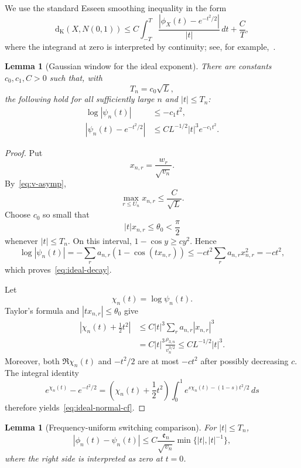 \documentclass[11pt]{article}
\newtheorem{lemma}[theorem]{Lemma}
\theoremstyle{remark}
\newcommand{\dd}{\,d}
\newcommand{\Kol}{\mathrm d_{\mathrm K}}
\begin{document}
We use the standard Esseen smoothing inequality in the form
\begin{equation}
\label{eq:esseen}
 \Kol(X,N(0,1))
 \le C\int_{-T}^T
 \frac{|\phi_X(t)-e^{-t^2/2}|}{|t|}\dd t
 +\frac{C}{T},
\end{equation}
where the integrand at zero is interpreted by continuity; see, for
example,~\cite[Chapter~V]{Petrov1975}.

\begin{lemma}[Gaussian window for the ideal exponent]
\label{lem:gaussian-window}
There are constants $c_0,c_1,C>0$ such that, with
\[
 T_n=c_0\sqrt L,
\]
the following hold for all sufficiently large $n$ and $|t|\le T_n$:
\begin{align}
 \log|\psi_n(t)|&\le-c_1t^2,\label{eq:ideal-decay}\\
 |\psi_n(t)-e^{-t^2/2}|
 &\le C L^{-1/2}|t|^3e^{-c_1t^2}.
 \label{eq:ideal-normal-cf}
\end{align}
\end{lemma}

\begin{proof}
Put
\[
 x_{n,r}=\frac{w_r}{\sqrt{v_n}}.
\]
By~\eqref{eq:v-asymp},
\[
 \max_{r\le U_n}x_{n,r}\le\frac{C}{\sqrt L}.
\]
Choose $c_0$ so small that
\[
 |t|x_{n,r}\le\theta_0<\frac\pi2
\]
whenever $|t|\le T_n$.  On this interval,
$1-\cos y\ge c y^2$.  Hence
\[
 \log|\psi_n(t)|
 =-\sum_ra_{n,r}(1-\cos(tx_{n,r}))
 \le-c t^2\sum_ra_{n,r}x_{n,r}^2
 =-ct^2,
\]
which proves~\eqref{eq:ideal-decay}.

Let
\[
 \chi_n(t)=\log\psi_n(t).
\]
Taylor's formula and $|tx_{n,r}|\le\theta_0$ give
\begin{align*}
 \left|\chi_n(t)+\frac12t^2\right|
 &\le C|t|^3\sum_ra_{n,r}|x_{n,r}|^3\\
 &=C|t|^3\frac{\rho_{3,n}}{v_n^{3/2}}
 \le C L^{-1/2}|t|^3.
\end{align*}
Moreover, both $\Re\chi_n(t)$ and $-t^2/2$ are at most $-ct^2$ after
possibly decreasing $c$.  The integral identity
\[
 e^{\chi_n(t)}-e^{-t^2/2}
 =\left(\chi_n(t)+\frac12t^2\right)
 \int_0^1
 e^{s\chi_n(t)-(1-s)t^2/2}\dd s
\]
therefore yields~\eqref{eq:ideal-normal-cf}.
\end{proof}

\begin{lemma}[Frequency-uniform switching comparison]
\label{lem:switch-cf}
For $|t|\le T_n$,
\begin{equation}
\label{eq:switch-cf}
 |\phi_n(t)-\psi_n(t)|
 \le C\frac{\mathfrak e_n}{\sqrt{v_n}}
 \min\{|t|,|t|^{-1}\},
\end{equation}
where the right side is interpreted as zero at $t=0$.
\end{lemma}
\end{document}
